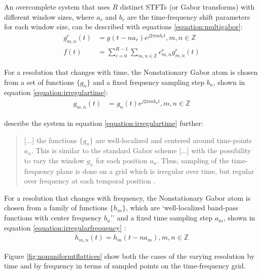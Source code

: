 \documentclass[report.tex]{subfiles}
\begin{document}
An overcomplete system that uses $R$ distinct STFTs (or Gabor transforms) with different window sizes, where $a_{r}$ and $b_{r}$ are the time-frequency shift parameters for each window size, can be described with equations \eqref{equation:multigabor}:
\begin{align}
	\nonumber g_{m,n}^{r}(t) &= g(t - na_{r})e^{j2\pi m b_{r} t}, m,n \in \mathbb{Z}\\
	\nonumber f(t) &= \sum_{r=0}^{R-1}\sum_{m,n \in \mathbb{Z}}c^{r}_{m,n}g^{r}_{m,n}(t) \tag{13}\label{equation:multigabor}
\end{align}

For a resolution that changes with time, the Nonstationary Gabor atom is chosen from a set of functions $\{g_{n}\}$ and a fixed frequency sampling step $b_{n}$, shown in equation \eqref{equation:irregulartime}:
\begin{align}\tag{14}\label{equation:irregulartime}
	g_{m,n}(t) &= g_{n}(t)e^{j2\pi m b_{n}t}, m,n \in \mathbb{Z}
\end{align}

\citeauthor{balazs} describe the system in equation \eqref{equation:irregulartime} further:

\begin{quote}
	[...] the functions $\{g_{n}\}$ are well-localized and centered around time-points $a_{n}$. This is similar to the standard Gabor scheme [...] with the possibility to vary the window $g_{n}$ for each position $a_{n}$. Thus, sampling of the time-frequency plane is done on a grid which is irregular over time, but regular over frequency at each temporal position \parencite[1485]{balazs}.
\end{quote}

For a resolution that changes with frequency, the Nonstationary Gabor atom is chosen from a family of functions $\{h_{m}\}$, which are `well-localized band-pass functions with center frequency $b_{n}$'' and a fixed time sampling step $a_{m}$, shown in equation \eqref{equation:irregularfrequency} \parencite[1486]{balazs}:
\begin{align}\tag{15}\label{equation:irregularfrequency}
	h_{m,n}(t) = h_{m}(t - na_{m}), m,n \in \mathbb{Z}
\end{align}

Figure \ref{fig:nonuniformtflattices} show both the cases of the varying resolution by time and by frequency in terms of sampled points on the time-frequency grid.
\end{document}
